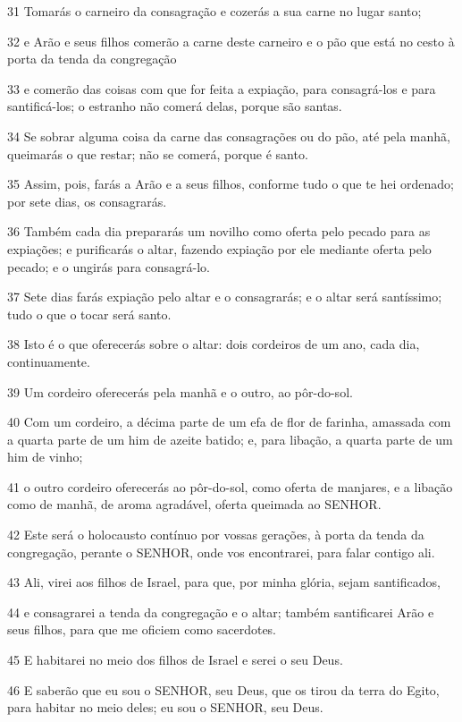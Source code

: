 \par 31 Tomarás o carneiro da consagração e cozerás a sua carne no lugar santo;
\par 32 e Arão e seus filhos comerão a carne deste carneiro e o pão que está no cesto à porta da tenda da congregação
\par 33 e comerão das coisas com que for feita a expiação, para consagrá-los e para santificá-los; o estranho não comerá delas, porque são santas.
\par 34 Se sobrar alguma coisa da carne das consagrações ou do pão, até pela manhã, queimarás o que restar; não se comerá, porque é santo.
\par 35 Assim, pois, farás a Arão e a seus filhos, conforme tudo o que te hei ordenado; por sete dias, os consagrarás.
\par 36 Também cada dia prepararás um novilho como oferta pelo pecado para as expiações; e purificarás o altar, fazendo expiação por ele mediante oferta pelo pecado; e o ungirás para consagrá-lo.
\par 37 Sete dias farás expiação pelo altar e o consagrarás; e o altar será santíssimo; tudo o que o tocar será santo.
\par 38 Isto é o que oferecerás sobre o altar: dois cordeiros de um ano, cada dia, continuamente.
\par 39 Um cordeiro oferecerás pela manhã e o outro, ao pôr-do-sol.
\par 40 Com um cordeiro, a décima parte de um efa de flor de farinha, amassada com a quarta parte de um him de azeite batido; e, para libação, a quarta parte de um him de vinho;
\par 41 o outro cordeiro oferecerás ao pôr-do-sol, como oferta de manjares, e a libação como de manhã, de aroma agradável, oferta queimada ao SENHOR.
\par 42 Este será o holocausto contínuo por vossas gerações, à porta da tenda da congregação, perante o SENHOR, onde vos encontrarei, para falar contigo ali.
\par 43 Ali, virei aos filhos de Israel, para que, por minha glória, sejam santificados,
\par 44 e consagrarei a tenda da congregação e o altar; também santificarei Arão e seus filhos, para que me oficiem como sacerdotes.
\par 45 E habitarei no meio dos filhos de Israel e serei o seu Deus.
\par 46 E saberão que eu sou o SENHOR, seu Deus, que os tirou da terra do Egito, para habitar no meio deles; eu sou o SENHOR, seu Deus.

